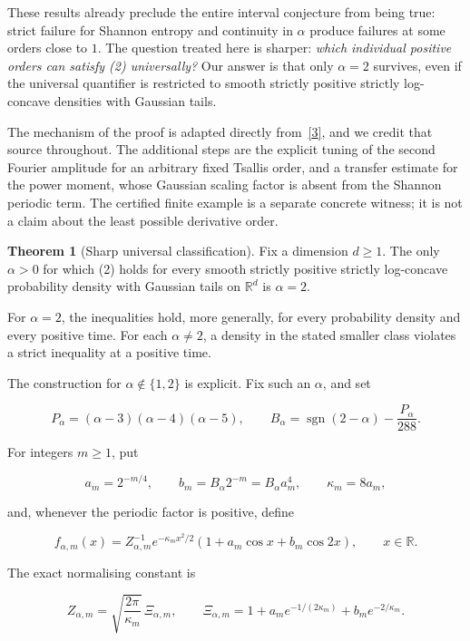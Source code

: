 \documentclass[
  11pt,
]{article}
\begin{document}
These results already preclude the entire interval conjecture from being
true: strict failure for Shannon entropy and continuity in \(\alpha\)
produce failures at some orders close to \(1\). The question treated
here is sharper: \emph{which individual positive orders can satisfy (2)
universally?} Our answer is that only \(\alpha=2\) survives, even if the
universal quantifier is restricted to smooth strictly positive strictly
log-concave densities with Gaussian tails.

The mechanism of the proof is adapted directly
from~\href{https://arxiv.org/abs/2608.30275v1}{{[}3{]}}, and we credit
that source throughout. The additional steps are the explicit tuning of
the second Fourier amplitude for an arbitrary fixed Tsallis order, and a
transfer estimate for the power moment, whose Gaussian scaling factor is
absent from the Shannon periodic term. The certified finite example is a
separate concrete witness; it is not a claim about the least possible
derivative order.

\textbf{Theorem 1} (Sharp universal classification). Fix a dimension
\(d\geq1\). The only \(\alpha>0\) for which (2) holds for every smooth
strictly positive strictly log-concave probability density with Gaussian
tails on \(\mathbb R^d\) is \(\alpha=2\).

For \(\alpha=2\), the inequalities hold, more generally, for every
probability density and every positive time. For each \(\alpha\ne2\), a
density in the stated smaller class violates a strict inequality at a
positive time.

The construction for \(\alpha\notin\{1,2\}\) is explicit. Fix such an
\(\alpha\), and set

\[
\tag{3}
 P_\alpha=(\alpha-3)(\alpha-4)(\alpha-5),\qquad
 B_\alpha=\operatorname{sgn}(2-\alpha)-\frac{P_\alpha}{288}.
\]

For integers \(m\geq1\), put

\[
\tag{4}
 a_m=2^{-m/4},\qquad b_m=B_\alpha2^{-m}=B_\alpha a_m^4,
 \qquad \kappa_m=8a_m,
\]

and, whenever the periodic factor is positive, define

\[
\tag{5}
 f_{\alpha,m}(x)=Z_{\alpha,m}^{-1}e^{-\kappa_m x^2/2}
       (1+a_m\cos x+b_m\cos2x),\qquad x\in\mathbb R.
\]

The exact normalising constant is

\[
\tag{6}
 Z_{\alpha,m}=\sqrt{\frac{2\pi}{\kappa_m}}\,\Xi_{\alpha,m},
 \qquad
 \Xi_{\alpha,m}=1+a_me^{-1/(2\kappa_m)}+b_me^{-2/\kappa_m}.
\]
\end{document}
